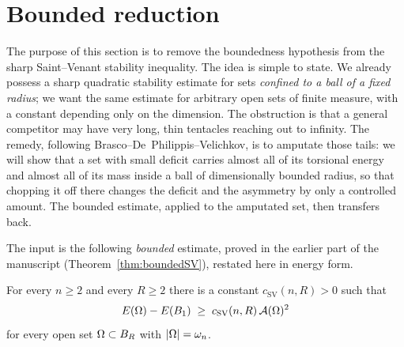 %
%

\section{Bounded reduction}\label{sec:bddred}

The purpose of this section is to remove the boundedness hypothesis from
the sharp Saint--Venant stability inequality. The idea is simple to
state. We already possess a sharp quadratic stability estimate for sets
\emph{confined to a ball of a fixed radius}; we want the same estimate
for arbitrary open sets of finite measure, with a constant depending
only on the dimension. The obstruction is that a general competitor may
have very long, thin tentacles reaching out to infinity. The remedy,
following Brasco--De~Philippis--Velichkov, is to amputate those tails:
we will show that a set with small deficit carries almost all of its
torsional energy and almost all of its mass inside a ball of
dimensionally bounded radius, so that chopping it off there changes the
deficit and the asymmetry by only a controlled amount. The bounded
estimate, applied to the amputated set, then transfers back.

The input is the following \emph{bounded} estimate, proved in the earlier
part of the manuscript (Theorem~\ref{thm:boundedSV}), restated here in
energy form.

\begin{theorem}\label{thm:SV-bounded}
For every $n\ge2$ and every $R\ge2$ there is a constant
$c_{\mathrm{SV}}(n,R)>0$ such that
\begin{equation}\label{eq:SV-bounded}
   E(\Omega)-E(B_1)\;\ge\;c_{\mathrm{SV}}(n,R)\,\mathcal A(\Omega)^2
\end{equation}
for every open set $\Omega\subset B_R$ with $\left|\Omega\right|=\omega_n$.
\end{theorem}


